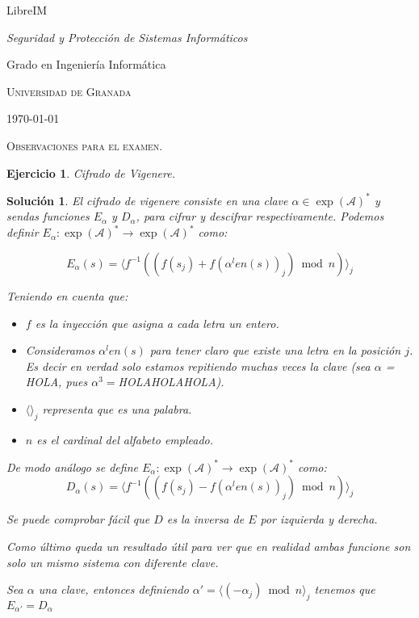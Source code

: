 \documentclass[
  a4paper,
  spanish,
  12pt,
]{scrartcl}
\theoremstyle{ejercicio-style}
\newtheorem{ejer}{Ejercicio}
\theoremstyle{remark-style}
\newtheorem*{sol}{Solución}
\begin{document}
\begin{flushright}
  LibreIM\vspace{.5em}

  \textit{Seguridad y Protección de Sistemas Informáticos}

  Grado en Ingeniería Informática

  \textsc{Universidad de Granada}\vspace{.5em}

  \today\vspace{.5em}
\end{flushright}

\begin{flushleft}
  \scshape\Large Observaciones para el examen.
\end{flushleft}

\begin{ejer}
  Cifrado de Vigenere.
\end{ejer}

\begin{sol}
  El cifrado de vigenere consiste en una clave $\alpha\in \exp (\mathcal{A})^*$ y sendas funciones $E_\alpha$ y $D_\alpha$, para cifrar y descifrar respectivamente. Podemos definir $E_\alpha: \exp (\mathcal{A})^* \to \exp (\mathcal{A})^*$ como:

  $$ E_\alpha (s) = \langle f^{-1}( (f(s_j) + f(\alpha^len(s))_j) \bmod  n)\rangle _j$$

  Teniendo en cuenta que:
  \begin{itemize}
  \item $f$ es la inyección que asigna a cada letra un entero.
  \item Consideramos $\alpha^len(s)$ para tener claro que existe una letra en la posición $j$. Es decir en verdad solo estamos repitiendo muchas veces la clave (sea $\alpha$ = HOLA, pues $\alpha^3=$HOLAHOLAHOLA).
  \item $\langle \rangle _j$ representa que es una palabra.
  \item $n$ es el cardinal del alfabeto empleado.
  \end{itemize}

  De modo análogo se define $E_\alpha: \exp (\mathcal{A})^* \to \exp (\mathcal{A})^*$ como:
  $$ D_\alpha (s) = \langle f^{-1}( (f(s_j) - f(\alpha^len(s))_j) \bmod  n)\rangle _j$$

  Se puede comprobar fácil que $D$ es la inversa de $E$ por izquierda y derecha.

  Como último queda un resultado útil para ver que en realidad ambas funcione son solo un mismo sistema con diferente clave.

  Sea $\alpha$ una clave, entonces definiendo $\alpha' = \langle (-\alpha_j) \bmod  n \rangle _j$ tenemos que $E_{\alpha'} = D_\alpha$
\end{sol}
\end{document}
